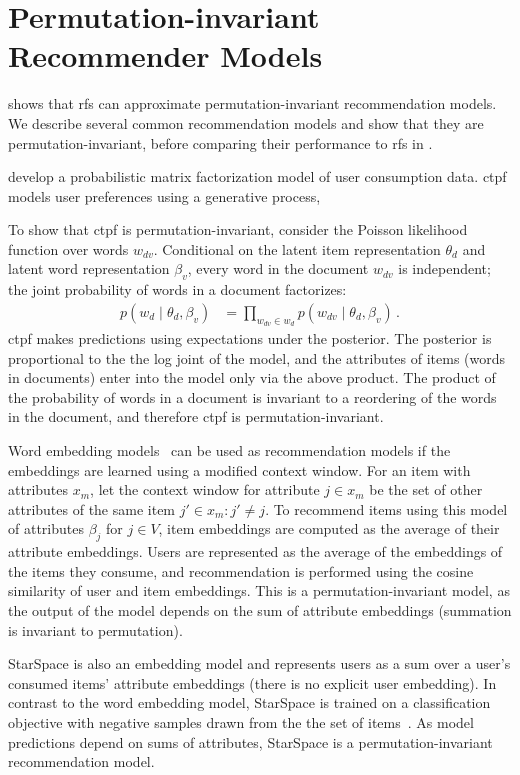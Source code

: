 \section{Permutation-invariant Recommender Models}
\label{sec:models}
 shows that \gls{rfs} can approximate permutation-invariant recommendation models. We describe several common recommendation models and show that they are permutation-invariant, before comparing their performance to \gls{rfs} in .

\citet{gopalan2014content-based} develop a probabilistic matrix factorization model of user consumption data. \Gls{ctpf} models user preferences using a generative process,

To show that \gls{ctpf} is permutation-invariant, consider the Poisson likelihood function over words $w_{dv}$. Conditional on the latent item representation $\theta_d$ and latent word representation $\beta_v$, every word in the document $w_{dv}$ is independent; the joint probability of words in a document factorizes:
\begin{align}
  p(w_{d} \mid \theta_d, \beta_v) &= \prod_{w_{dv} \in w_d} p(w_{dv} \mid \theta_d, \beta_v)\, .
\end{align}
\gls{ctpf} makes predictions using expectations under the posterior. The posterior is proportional to the the log joint of the model, and the attributes of items (words in documents) enter into the model only via the above product. The product of the probability of words in a document is invariant to a reordering of the words in the document, and therefore \gls{ctpf} is permutation-invariant.

Word embedding models~\citep{mikolov2013distributed} can be used as recommendation models if the embeddings are learned using a modified context window. For an item with attributes $x_m$, let the context window for attribute ${j\in x_m}$ be the set of other attributes of the same item ${j' \in x_m: j'\neq j}$. To recommend items using this model of attributes $\beta_j$ for $j \in V$, item embeddings are computed as the average of their attribute embeddings. Users are represented as the average of the embeddings of the items they consume, and recommendation is performed using the cosine similarity of user and item embeddings. This is a permutation-invariant model, as the output of the model depends on the sum of attribute embeddings (summation is invariant to permutation).

StarSpace is also an embedding model and represents users as a sum over a user's consumed items' attribute embeddings (there is no explicit user embedding). In contrast to the word embedding model, StarSpace is trained on a classification objective with negative samples drawn from the the set of items~\citep{wu2018starspace:}. As model predictions depend on sums of attributes, StarSpace is a permutation-invariant recommendation model.

